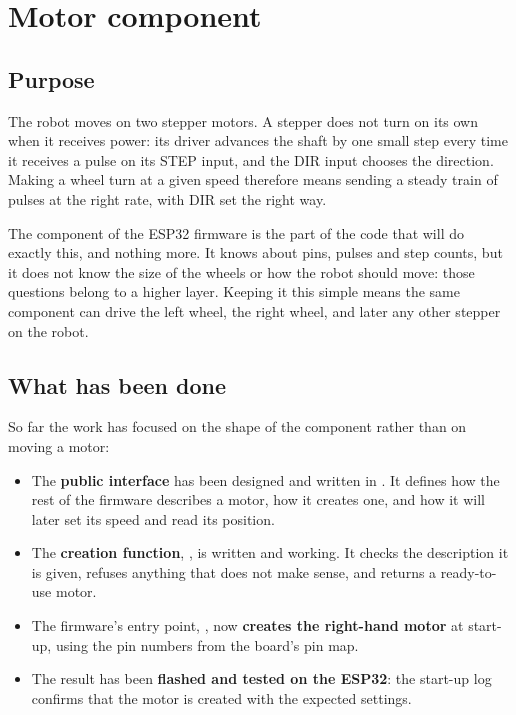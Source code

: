 \section{Motor component}\label{sec:motor}

\subsection{Purpose}
The robot moves on two stepper motors. A stepper does not turn on its own when it receives power: its driver advances the shaft by one small step every time it receives a pulse on its STEP input, and the DIR input chooses the direction. Making a wheel turn at a given speed therefore means sending a steady train of pulses at the right rate, with DIR set the right way.

The  component of the ESP32 firmware is the part of the code that will do exactly this, and nothing more. It knows about pins, pulses and step counts, but it does not know the size of the wheels or how the robot should move: those questions belong to a higher layer. Keeping it this simple means the same component can drive the left wheel, the right wheel, and later any other stepper on the robot.

\subsection{What has been done}
So far the work has focused on the shape of the component rather than on moving a motor:

\begin{itemize}
  \item The \textbf{public interface} has been designed and written in . It defines how the rest of the firmware describes a motor, how it creates one, and how it will later set its speed and read its position.
  \item The \textbf{creation function}, , is written and working. It checks the description it is given, refuses anything that does not make sense, and returns a ready-to-use motor.
  \item The firmware's entry point, , now \textbf{creates the right-hand motor} at start-up, using the pin numbers from the board's pin map.
  \item The result has been \textbf{flashed and tested on the ESP32}: the start-up log confirms that the motor is created with the expected settings.
\end{itemize}

